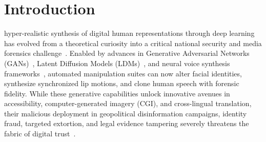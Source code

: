 \documentclass[journal]{IEEEtran}
\begin{document}
\section{Introduction}
 hyper-realistic synthesis of digital human representations through deep learning has evolved from a theoretical curiosity into a critical national security and media forensics challenge~\cite{verdoliva2020media}. Enabled by advances in Generative Adversarial Networks (GANs)~\cite{goodfellow2014generative, karras2020analyzing}, Latent Diffusion Models (LDMs)~\cite{rombach2022high}, and neural voice synthesis frameworks~\cite{prajwal2020lip}, automated manipulation suites can now alter facial identities, synthesize synchronized lip motions, and clone human speech with forensic fidelity. While these generative capabilities unlock innovative avenues in accessibility, computer-generated imagery (CGI), and cross-lingual translation, their malicious deployment in geopolitical disinformation campaigns, identity fraud, targeted extortion, and legal evidence tampering severely threatens the fabric of digital trust~\cite{dolhansky2020deepfake}.
\end{document}
